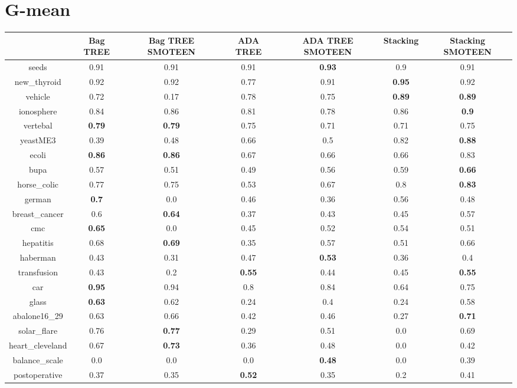 \documentclass{article}%
\begin{document}
\section*{G{-}mean}%
\begin{tabular}{c|cccccc}%
&Bag TREE&Bag TREE SMOTEEN&ADA TREE&ADA TREE SMOTEEN&Stacking&Stacking SMOTEEN\\%
\hline%
seeds&0.91&0.91&0.91&\textbf{0.93}&0.9&0.91\\%
new\_thyroid&0.92&0.92&0.77&0.91&\textbf{0.95}&0.92\\%
vehicle&0.72&0.17&0.78&0.75&\textbf{0.89}&\textbf{0.89}\\%
ionosphere&0.84&0.86&0.81&0.78&0.86&\textbf{0.9}\\%
vertebal&\textbf{0.79}&\textbf{0.79}&0.75&0.71&0.71&0.75\\%
yeastME3&0.39&0.48&0.66&0.5&0.82&\textbf{0.88}\\%
ecoli&\textbf{0.86}&\textbf{0.86}&0.67&0.66&0.66&0.83\\%
bupa&0.57&0.51&0.49&0.56&0.59&\textbf{0.66}\\%
horse\_colic&0.77&0.75&0.53&0.67&0.8&\textbf{0.83}\\%
german&\textbf{0.7}&0.0&0.46&0.36&0.56&0.48\\%
breast\_cancer&0.6&\textbf{0.64}&0.37&0.43&0.45&0.57\\%
cmc&\textbf{0.65}&0.0&0.45&0.52&0.54&0.51\\%
hepatitis&0.68&\textbf{0.69}&0.35&0.57&0.51&0.66\\%
haberman&0.43&0.31&0.47&\textbf{0.53}&0.36&0.4\\%
transfusion&0.43&0.2&\textbf{0.55}&0.44&0.45&\textbf{0.55}\\%
car&\textbf{0.95}&0.94&0.8&0.84&0.64&0.75\\%
glass&\textbf{0.63}&0.62&0.24&0.4&0.24&0.58\\%
abalone16\_29&0.63&0.66&0.42&0.46&0.27&\textbf{0.71}\\%
solar\_flare&0.76&\textbf{0.77}&0.29&0.51&0.0&0.69\\%
heart\_cleveland&0.67&\textbf{0.73}&0.36&0.48&0.0&0.42\\%
balance\_scale&0.0&0.0&0.0&\textbf{0.48}&0.0&0.39\\%
postoperative&0.37&0.35&\textbf{0.52}&0.35&0.2&0.41\\%
\end{tabular}

%
\end{document}
